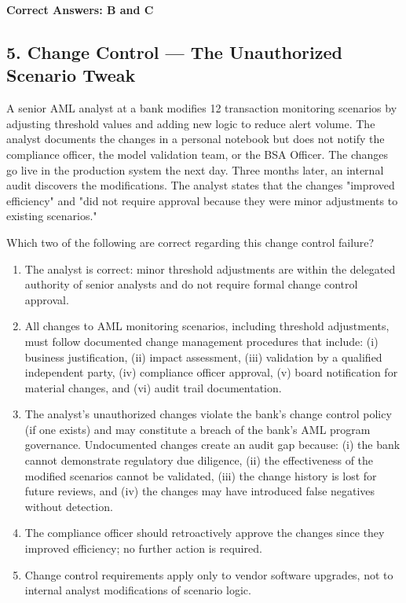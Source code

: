 \documentclass[11pt,a4paper]{article}
\begin{document}
	\textbf{Correct Answers: B and C}
	
	\subsection{5. Change Control — The Unauthorized Scenario Tweak}
	
	A senior AML analyst at a bank modifies 12 transaction monitoring scenarios by adjusting threshold values and adding new logic to reduce alert volume. The analyst documents the changes in a personal notebook but does not notify the compliance officer, the model validation team, or the BSA Officer. The changes go live in the production system the next day. Three months later, an internal audit discovers the modifications. The analyst states that the changes "improved efficiency" and "did not require approval because they were minor adjustments to existing scenarios."
	
	Which two of the following are correct regarding this change control failure?
	
	\begin{enumerate}[label=\Alph*.]
		\item The analyst is correct: minor threshold adjustments are within the delegated authority of senior analysts and do not require formal change control approval.
		\item All changes to AML monitoring scenarios, including threshold adjustments, must follow documented change management procedures that include: (i) business justification, (ii) impact assessment, (iii) validation by a qualified independent party, (iv) compliance officer approval, (v) board notification for material changes, and (vi) audit trail documentation.
		\item The analyst's unauthorized changes violate the bank's change control policy (if one exists) and may constitute a breach of the bank's AML program governance. Undocumented changes create an audit gap because: (i) the bank cannot demonstrate regulatory due diligence, (ii) the effectiveness of the modified scenarios cannot be validated, (iii) the change history is lost for future reviews, and (iv) the changes may have introduced false negatives without detection.
		\item The compliance officer should retroactively approve the changes since they improved efficiency; no further action is required.
		\item Change control requirements apply only to vendor software upgrades, not to internal analyst modifications of scenario logic.
	\end{enumerate}
	
\end{document}
